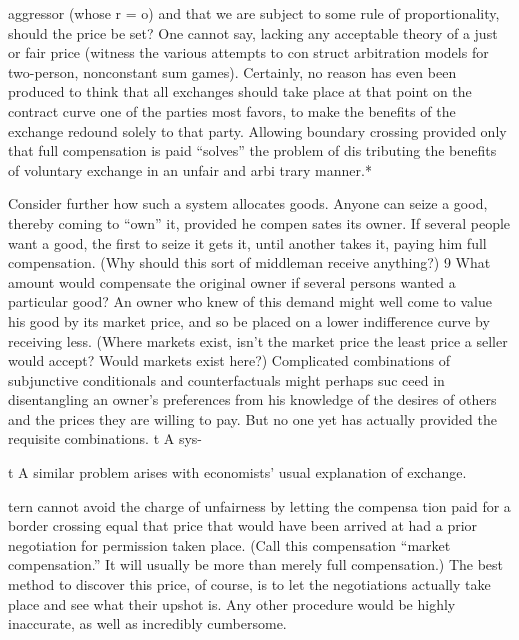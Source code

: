 \documentclass[11pt,openany]{book}
\begin{document}
aggressor (whose r = o) and that we are subject to some rule of proportionality, should the price be set? One cannot say, lacking any acceptable theory of a just or fair price (witness the various attempts to con struct arbitration models for two-person, nonconstant sum games). Certainly, no reason has even been produced to think that all exchanges should take place at that point on the contract curve one of the parties most favors, to make the benefits of the exchange redound solely to that party. Allowing boundary crossing provided only that full compensation is paid ``solves'' the problem of dis tributing the benefits of voluntary exchange in an unfair and arbi trary manner.* 

Consider further how such a system allocates goods. Anyone can seize a good, thereby coming to ``own'' it, provided he compen sates its owner. If several people want a good, the first to seize it gets it, until another takes it, paying him full compensation. (Why should this sort of middleman receive anything?) 9 What amount would compensate the original owner if several persons wanted a particular good? An owner who knew of this demand might well come to value his good by its market price, and so be placed on a lower indifference curve by receiving less. (Where markets exist, isn't the market price the least price a seller would accept? Would markets exist here?) Complicated combinations of subjunctive conditionals and counterfactuals might perhaps suc ceed in disentangling an owner's preferences from his knowledge of the desires of others and the prices they are willing to pay. But no one yet has actually provided the requisite combinations. t A sys-

t A similar problem arises with economists' usual explanation of exchange. 

tern cannot avoid the charge of unfairness by letting the compensa tion paid for a border crossing equal that price that would have been arrived at had a prior negotiation for permission taken place. (Call this compensation ``market compensation.'' It will usually be more than merely full compensation.) The best method to discover this price, of course, is to let the negotiations actually take place and see what their upshot is. Any other procedure would be highly inaccurate, as well as incredibly cumbersome. 
\end{document}
